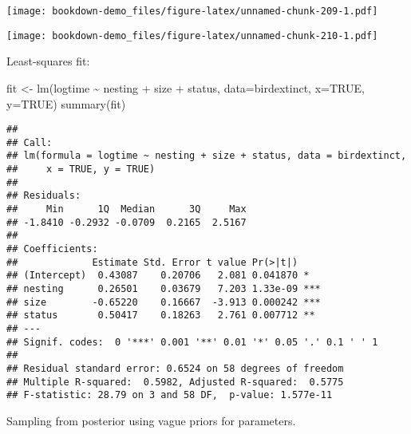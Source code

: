 \documentclass[
]{book}
\newenvironment{Shaded}{\begin{snugshade}}{\end{snugshade}}
\newcommand{\AttributeTok}[1]{\textcolor[rgb]{0.77,0.63,0.00}{#1}}
\newcommand{\ConstantTok}[1]{\textcolor[rgb]{0.00,0.00,0.00}{#1}}
\newcommand{\DecValTok}[1]{\textcolor[rgb]{0.00,0.00,0.81}{#1}}
\newcommand{\FunctionTok}[1]{\textcolor[rgb]{0.00,0.00,0.00}{#1}}
\newcommand{\NormalTok}[1]{#1}
\newcommand{\OtherTok}[1]{\textcolor[rgb]{0.56,0.35,0.01}{#1}}
\newcommand{\SpecialCharTok}[1]{\textcolor[rgb]{0.00,0.00,0.00}{#1}}
\begin{document}
\texttt{[image: bookdown-demo\_files/figure-latex/unnamed-chunk-209-1.pdf]}

\begin{Shaded}
\end{Shaded}

\texttt{[image: bookdown-demo\_files/figure-latex/unnamed-chunk-210-1.pdf]}

Least-squares fit:

\begin{Shaded}
\begin{Highlighting}[]
\NormalTok{fit }\OtherTok{\textless{}{-}} \FunctionTok{lm}\NormalTok{(logtime }\SpecialCharTok{\textasciitilde{}}\NormalTok{ nesting }\SpecialCharTok{+}\NormalTok{ size }\SpecialCharTok{+}\NormalTok{ status,}
          \AttributeTok{data=}\NormalTok{birdextinct, }\AttributeTok{x=}\ConstantTok{TRUE}\NormalTok{, }\AttributeTok{y=}\ConstantTok{TRUE}\NormalTok{)}
\FunctionTok{summary}\NormalTok{(fit)}
\end{Highlighting}
\end{Shaded}

\begin{verbatim}
## 
## Call:
## lm(formula = logtime ~ nesting + size + status, data = birdextinct, 
##     x = TRUE, y = TRUE)
## 
## Residuals:
##     Min      1Q  Median      3Q     Max 
## -1.8410 -0.2932 -0.0709  0.2165  2.5167 
## 
## Coefficients:
##             Estimate Std. Error t value Pr(>|t|)    
## (Intercept)  0.43087    0.20706   2.081 0.041870 *  
## nesting      0.26501    0.03679   7.203 1.33e-09 ***
## size        -0.65220    0.16667  -3.913 0.000242 ***
## status       0.50417    0.18263   2.761 0.007712 ** 
## ---
## Signif. codes:  0 '***' 0.001 '**' 0.01 '*' 0.05 '.' 0.1 ' ' 1
## 
## Residual standard error: 0.6524 on 58 degrees of freedom
## Multiple R-squared:  0.5982, Adjusted R-squared:  0.5775 
## F-statistic: 28.79 on 3 and 58 DF,  p-value: 1.577e-11
\end{verbatim}

Sampling from posterior using vague priors for parameters.

\begin{Shaded}
\end{Shaded}
\end{document}
